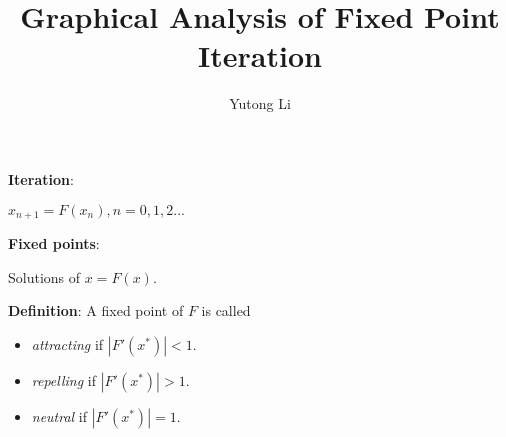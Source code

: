 \documentclass{beamer}
\title{Graphical Analysis of Fixed Point Iteration}
\author{Yutong Li}\institute{University of Washington}
\begin{document}
\begin{frame}
\titlepage

\end{frame}

\begin{frame}
\noindent \textbf{Iteration}:
\vspace{2mm}

$x_{n+1}=F(x_n), n=0,1,2...$

\vspace{10mm}

\noindent \textbf{Fixed points}:
\vspace{2mm}

Solutions of $x=F(x)$.
\vspace{2mm}
\end{frame}

\begin{frame}
\noindent \textbf{Definition}: A fixed point of $F$ is called 

\begin{itemize}
	\item \textit{attracting} if $|F'(x^*)|<1$.
	\item \textit{repelling} if $|F'(x^*)|>1$.
	\item \textit{neutral} if $|F'(x^*)|=1$.
\end{itemize}
\end{frame}
\end{document}
